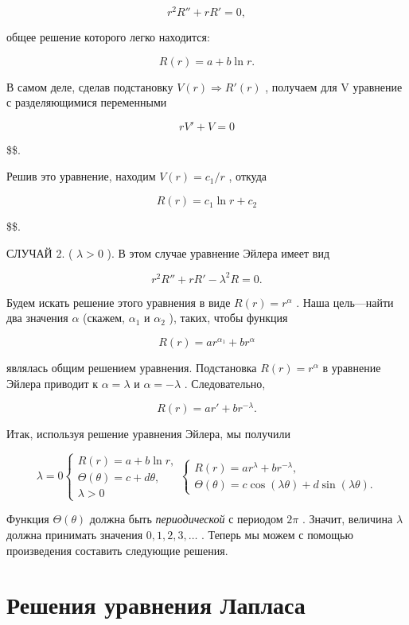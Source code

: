 \documentclass[
  ukrainian,
]{article}
\begin{document}
\[
r^2R'' + rR' = 0,
\]

общее решение которого легко находится:

\[
R(r) = a + b \ln r.
\]

В самом деле, сделав подстановку
\(V\left(r\right) \Rightarrow R'\left(r\right)\) , получаем для V
уравнение с разделяющимися переменными

\[
rV' + V = 0
\]

\$\$.

Решив это уравнение, находим \(V\left(r\right)=c_{1}/r\) , откуда

\[
R(r) = c_1 \ln r + c_2
\]

\$\$.

СЛУЧАЙ 2. ( \(\lambda > 0\) ). В этом случае уравнение Эйлера имеет вид

\[
r^2R'' + rR' - \lambda^2R = 0.
\]

Будем искать решение этого уравнения в виде \(R(r)=r^{\alpha}\) . Наша
цель---найти два значения \(\alpha\) (скажем, \(\alpha_1\) и
\(\alpha_2\) ), таких, чтобы функция

\[
R(r) = ar^{\alpha_1} + br^{\alpha}
\]

являлась общим решением уравнения. Подстановка \(R(r) = r^{\alpha}\) в
уравнение Эйлера приводит к \(\alpha = \lambda\) и \(\alpha = -\lambda\)
. Следовательно,

\[
R(r) = ar' + br^{-\lambda}.
\]

Итак, используя решение уравнения Эйлера, мы получили

\[
\lambda = 0 \begin{cases} R(r) = a + b \ln r, \\ \Theta(\theta) = c + d\theta, \\ \lambda > 0 \end{cases}
\begin{cases} R(r) = ar^{\lambda} + br^{-\lambda}, \\ \Theta(\theta) = c \cos(\lambda \theta) + d \sin(\lambda \theta). \end{cases}
\]

Функция \(\Theta(\theta)\) должна быть \emph{периодической} с периодом
\(2\pi\) . Значит, величина \(\lambda\) должна принимать значения
\(0, 1, 2, 3, \ldots\) . Теперь мы можем с помощью произведения
составить следующие решения.

\section{Решения уравнения
Лапласа}\label{ux440ux435ux448ux435ux43dux438ux44f-ux443ux440ux430ux432ux43dux435ux43dux438ux44f-ux43bux430ux43fux43bux430ux441ux430}
\end{document}
